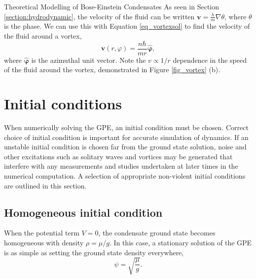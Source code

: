 \begin{chapter}{\label{cha:theoretical_model}Theoretical Modelling of Bose-Einstein Condensates}
As seen in Section \ref{section:hydrodynamic}, the velocity of the fluid can be written $\mathbf{v} = \frac{h}{m}\nabla\theta$, where $\theta$ is the phase. We can use this with Equation \ref{eq_vortexsol} to find the velocity of the fluid around a vortex,
	\begin{equation}\label{eq_vortexvel}
	\mathbf{v}(r,\varphi) = \frac{n \hbar}{mr} {\bm{\hat{\varphi}}},
	\end{equation}
where ${\bm{\hat{\varphi}}}$ is the azimuthal unit vector. Note the $v \propto 1/r$ dependence in the speed of the fluid around the vortex, demonstrated in Figure \ref{fig_vortex} (b). 

\section{\label{section:inital} Initial conditions}
	When numerically solving the GPE, an initial condition must be chosen. Correct choice of initial condition is important for accurate simulation of dynamics. If an unstable initial condition is chosen far from the ground state solution, noise and other excitations such as solitary waves and vortices may be generated that interfere with any measurements and studies undertaken at later times in the numerical computation. A selection of appropriate non-violent initial conditions are outlined in this section. 
	\subsection{\label{section:homoinit} Homogeneous initial condition}
	When the potential term $V=0$, the condensate ground state becomes homogeneous with density $\rho=\mu/g$. In this case, a stationary solution of the GPE is as simple as setting the ground state density everywhere,
	\begin{equation}
		\psi = \sqrt{\frac{\mu}{g}}.
		\label{eq:homoinit}
	\end{equation}


\end{chapter}

